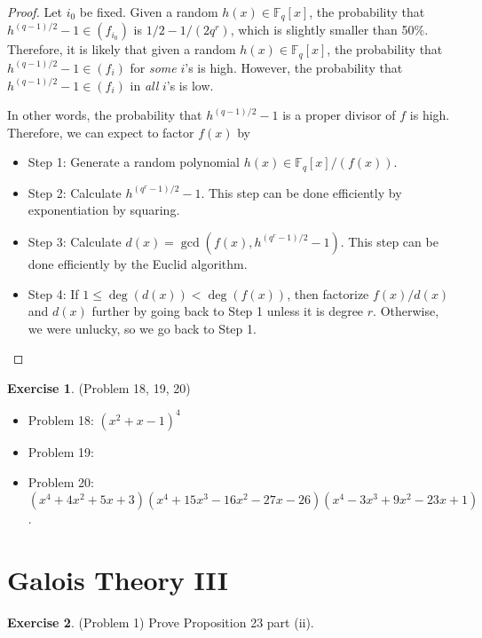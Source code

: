 \documentclass[12pt, psamsfonts]{amsart}
\theoremstyle{definition}
\newtheorem*{exer}{Exercise}
\theoremstyle{remark}
\numberwithin{equation}{section}
\begin{document}
\begin{proof}
  Let $i_0$ be fixed.
  Given a random $h(x) \in \mathbb{F}_q[x]$, the probability that $h^{(q - 1)/2} - 1 \in (f_{i_0})$ is $1/2 - 1/(2q^r)$, which is slightly smaller than 50\%.
  Therefore, it is likely that given a random $h(x) \in \mathbb{F}_q[x]$, the probability that $h^{(q - 1)/2} - 1 \in (f_i)$ for \textit{some} $i$'s is high.
  However, the probability that $h^{(q - 1)/2} - 1 \in (f_i)$ in \textit{all} $i$'s is low.

  In other words, the probability that $h^{(q - 1)/2} - 1$ is a proper divisor of $f$ is high.
  Therefore, we can expect to factor $f(x)$ by 

  \begin{itemize}
    \item
      Step 1: Generate a random polynomial $h(x) \in \mathbb{F}_q[x]/(f(x))$.
    \item
      Step 2: Calculate $h^{(q^r - 1)/2} - 1$.
      This step can be done efficiently by exponentiation by squaring.
    \item
      Step 3: Calculate $d(x) = \gcd(f(x), h^{(q^r - 1)/2} - 1)$.
      This step can be done efficiently by the Euclid algorithm.
    \item
      Step 4: If $1 \leq \deg(d(x)) < \deg(f(x))$, then factorize $f(x)/d(x)$ and $d(x)$ further by going back to Step 1 unless it is degree $r$.
      Otherwise, we were unlucky, so we go back to Step 1.
  \end{itemize}
\end{proof}

\begin{exer}{(Problem 18, 19, 20)}
  \begin{itemize}
    \item
      Problem 18: $(x^{2} + x - 1)^4$
    \item
      Problem 19:\todo[inline,caption={}]{
      }
    \item
      Problem 20: $(x^{4} + 4 x^{2} + 5 x + 3)(x^{4} + 15 x^{3} - 16 x^{2} - 27 x - 26)(x^{4} - 3 x^{3} + 9 x^{2} - 23 x + 1)$.
  \end{itemize}
\end{exer}

\section{Galois Theory III}

\begin{exer}{(Problem 1)}
  Prove Proposition 23 part (ii).
\end{exer}
\end{document}
